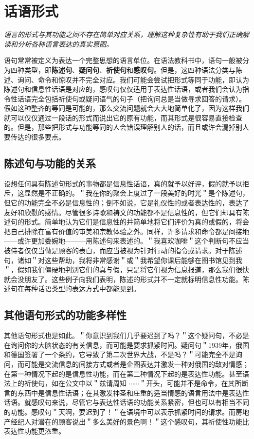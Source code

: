 \section{话语形式}

\begin{logicbox}[title=引言]
\textit{语言的形式与其功能之间不存在简单对应关系，理解这种复杂性有助于我们正确解读和分析各种语言表达的真实意图。}
\end{logicbox}

语句常常被定义为表达一个完整思想的语言单位。在语法教科书中，语句一般被分为四种类型，即\textbf{陈述句}、\textbf{疑问句}、\textbf{祈使句}和\textbf{感叹句}。但是，这四种语法分类与陈述、询问、命令和惊叹并不完全对应。我们可能会尝试把形式等同于功能，即认为陈述句和信息性话语是对应的，感叹句仅仅适用于表达性话语，或者我们会认为指令性话语完全包括祈使句或疑问语气的句子（把询问总是当做寻求回答的请求）。假如这种整齐的等同是可能的，那么交流问题就会大大地简单化了，因为这样我们就可以仅仅通过一段话的形式而说出它的原有功能，而其形式是很容易直接检查的。但是，那些把形式与功能等同的人会错误理解别人的话，而且或许会漏掉别人要传达的很多要点。

\subsection{陈述句与功能的关系}

设想任何具有陈述句形式的事物都是信息性话语，真的就予以好评，假的就予以拒斥，这显然是不正确的。＂我在你的聚会上度过了一段美好的时光＂是个陈述句，但它的功能完全不必是信息性的；倒不如说，它是礼仪性的或者表达性的，表达了友好和欣慰的感情。尽管很多诗歌和祷文的功能都不是信息性的，但它们却具有陈述句的形式。简单地认为它们是信息性的并简单地将它们评价为真的或假的，将会把自己排除在富有价值的审美和宗教体验之外。同样，许多请求和命令都是间接地——或许更加委婉地———用陈述句来表述的。＂我喜欢咖啡＂这个判断句不应当被侍者仅仅当做是顾客的表白，而应当被视为针对行动的指令或请求。对于陈述句，诸如＂对这些帮助，我将非常感谢＂或＂我希望你课后能够在图书馆见到我＂，假如我们僵硬地判别它们的真与假，只是将它们视为信息报道，那么我们很快就会没朋友了。这些例子向我们表明，陈述的形式并不一定就标明信息性功能。陈述句在每种话语类型的表达方式中都能见到。

\subsection{其他语句形式的功能多样性}

其他语句形式也是如此。＂你意识到我们几乎要迟到了吗？＂这个疑问句，不必是在询问你的大脑状态的有关信息，而可能是要求抓紧时间。疑问句＂1939年，俄国和德国签署了一个条约，它导致了第二次世界大战，不是吗？＂可能完全不是询问，而可能是交流信息的间接方式或者是企图表达并激发一种对俄国的敌对情感；在第一种情况下起的是信息性功能，而在第二种情况下起的是表达性功能。甚至语法上的祈使句，如在公文中以＂兹请周知 $\cdots \cdots$＂开头，可能并不是命令，在其所断言的东西中是信息性话语；在其激发神圣和庄重的适当情感的语言用法中是表达性话语。就感叹句来说，尽管它与表达性话语的功能关系紧密，但也可以有相当不同的功能。感叹句＂天啊，要迟到了！＂在语境中可以表示抓紧时间的请求。而房地产经纪人对潜在的顾客说出＂多么美好的景色啊！＂这个感叹句，其祈使性功能比表达性功能更浓重。

